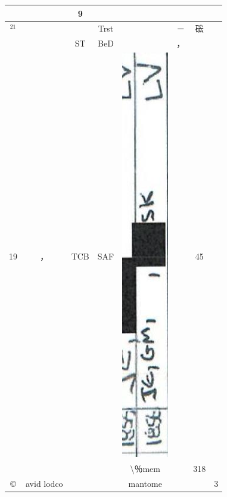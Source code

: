\documentclass[10pt]{article}
\begin{document}
\begin{center}
\begin{tabular}{|c|c|c|c|c|c|c|c|}
 &  & 9 &  \\
\hline
\({ }^{21}\) &  &  & Trst &  & － & 硡 &  \\
\hline
 &  & ST & BeD &  & ， &  &  \\
\hline
19 & ， & TCB & SAF & \includegraphics[max width=\textwidth]{2025_02_27_dd68c3d38de88f0516d9g-122(2)}
 &  & 45 &  \\
\hline
 &  &  &  & \textbackslash ％mem &  & 318 &  \\
\hline
© & avid lodco &  &  & mantome &  &  & 3 \\
\hline
\end{tabular}
\end{center}
\end{document}
